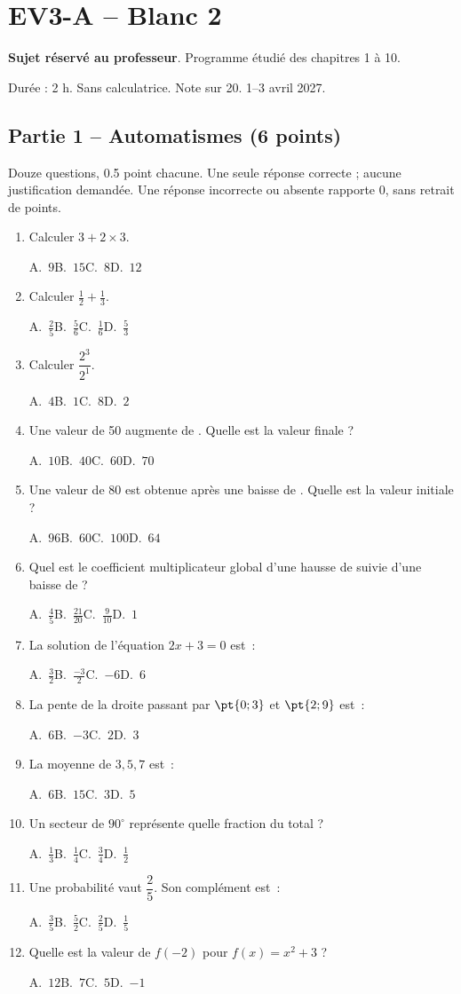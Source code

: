 \mxnewpage\section*{EV3-A -- Blanc 2}\label{EV3-A}
\textbf{Sujet réservé au professeur}. Programme étudié des chapitres 1 à 10.\par Durée : 2 h. Sans calculatrice. Note sur 20. 1–3 avril 2027.
\subsection*{Partie 1 -- Automatismes (6 points)}
Douze questions, \num{0,5} point chacune. Une seule réponse correcte ; aucune justification demandée. Une réponse incorrecte ou absente rapporte 0, sans retrait de points.
\begin{enumerate}
\item Calculer $3+2\times3$.\par A.~$9$\quad B.~$15$\quad C.~$8$\quad D.~$12$
\item Calculer $\frac12+\frac13$.\par A.~$\frac{2}{5}$\quad B.~$\frac{5}{6}$\quad C.~$\frac{1}{6}$\quad D.~$\frac{5}{3}$
\item Calculer $\dfrac{2^3}{2^{1}}$.\par A.~$4$\quad B.~$1$\quad C.~$8$\quad D.~$2$
\item Une valeur de 50 augmente de . Quelle est la valeur finale ?\par A.~$10$\quad B.~$40$\quad C.~$60$\quad D.~$70$
\item Une valeur de 80 est obtenue après une baisse de . Quelle est la valeur initiale ?\par A.~$96$\quad B.~$60$\quad C.~$100$\quad D.~$64$
\item Quel est le coefficient multiplicateur global d’une hausse de  suivie d’une baisse de  ?\par A.~$\frac{4}{5}$\quad B.~$\frac{21}{20}$\quad C.~$\frac{9}{10}$\quad D.~$1$
\item La solution de l’équation $2x+3=0$ est~:\par A.~$\frac{3}{2}$\quad B.~$\frac{-3}{2}$\quad C.~$-6$\quad D.~$6$
\item La pente de la droite passant par $\pt{0;3}$ et $\pt{2;9}$ est~:\par A.~$6$\quad B.~$-3$\quad C.~$2$\quad D.~$3$
\item La moyenne de $3, 5, 7$ est~:\par A.~$6$\quad B.~$15$\quad C.~$3$\quad D.~$5$
\item Un secteur de $90^\circ$ représente quelle fraction du total ?\par A.~$\frac{1}{3}$\quad B.~$\frac{1}{4}$\quad C.~$\frac{3}{4}$\quad D.~$\frac{1}{2}$
\item Une probabilité vaut $\dfrac{2}{5}$. Son complément est~:\par A.~$\frac{3}{5}$\quad B.~$\frac{5}{2}$\quad C.~$\frac{2}{5}$\quad D.~$\frac{1}{5}$
\item Quelle est la valeur de $f(-2)$ pour $f(x)=x^2+3$ ?\par A.~$12$\quad B.~$7$\quad C.~$5$\quad D.~$-1$
\end{enumerate}
